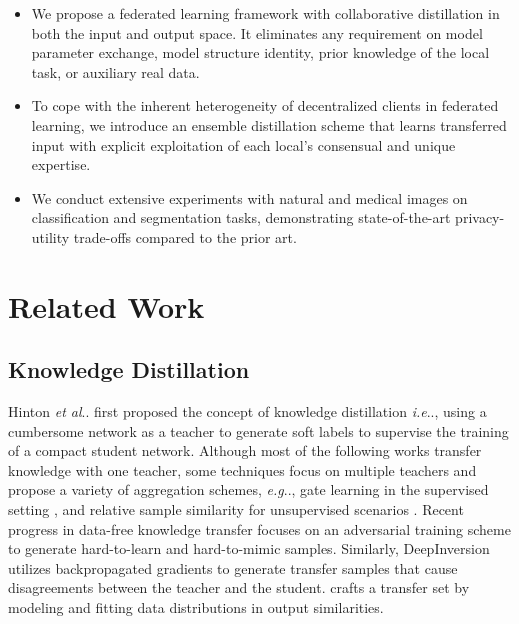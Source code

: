 \documentclass[letterpaper]{article} %
\makeatletter
\DeclareRobustCommand\onedot{\futurelet\@let@token\@onedot}
\def\@onedot{\ifx\@let@token.\else.\null\fi\xspace}
\def\eg{\emph{e.g}\onedot} \def\Eg{\emph{E.g}\onedot}
\def\ie{\emph{i.e}\onedot} \def\Ie{\emph{I.e}\onedot}
\def\etal{\emph{et al}\onedot}
\makeatother
\begin{document}
 \begin{itemize}
     \item
We propose a federated learning framework with collaborative distillation in both the input and output space. It eliminates any requirement on model parameter exchange, model structure identity, prior knowledge of the local task, or auxiliary real data.
     \item
 To cope with the inherent heterogeneity of decentralized clients in federated learning, we introduce an ensemble distillation scheme that learns transferred input with explicit exploitation of each local's consensual and unique expertise.
     \item
We conduct extensive experiments with natural and medical images on classification and segmentation tasks, demonstrating state-of-the-art privacy-utility trade-offs compared to the prior art.
\end{itemize}

\section{Related Work}
\label{sec:related}
\subsection{Knowledge Distillation}

Hinton \etal \cite{hinton2015distilling} first proposed the concept of knowledge distillation \ie, using a cumbersome network as a teacher to generate soft labels to supervise the training of a compact student network. %
Although most of the following works transfer knowledge with one teacher, some techniques focus on multiple teachers and propose a variety of aggregation schemes, \eg, gate learning in the supervised setting \cite{asif2019ensemble, xiang2020learning}, and relative sample similarity for unsupervised scenarios \cite{wu2019distilled}. Recent progress in data-free knowledge transfer \cite{fang2019data, chen2019data} focuses on an adversarial training scheme to generate hard-to-learn and hard-to-mimic samples. Similarly, DeepInversion \cite{yin2020dreaming} utilizes backpropagated gradients to generate transfer samples that cause disagreements between the teacher and the student. \cite{nayak2019zero} crafts a transfer set by modeling and fitting data distributions in output similarities. %
\end{document}
